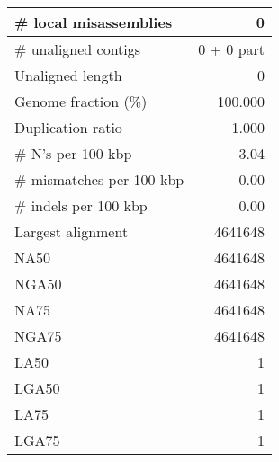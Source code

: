 \documentclass[12pt,a4paper]{article}
\begin{document}
\begin{table}[ht]
\begin{center}
\begin{tabular}{|l*{1}{|r}|}
\# local misassemblies & 0 \\ \hline
\# unaligned contigs & 0 + 0 part \\ \hline
Unaligned length & 0 \\ \hline
Genome fraction (\%) & 100.000 \\ \hline
Duplication ratio & 1.000 \\ \hline
\# N's per 100 kbp & 3.04 \\ \hline
\# mismatches per 100 kbp & 0.00 \\ \hline
\# indels per 100 kbp & 0.00 \\ \hline
Largest alignment & 4641648 \\ \hline
NA50 & 4641648 \\ \hline
NGA50 & 4641648 \\ \hline
NA75 & 4641648 \\ \hline
NGA75 & 4641648 \\ \hline
LA50 & 1 \\ \hline
LGA50 & 1 \\ \hline
LA75 & 1 \\ \hline
LGA75 & 1 \\ \hline
\end{tabular}
\end{center}
\end{table}
\end{document}

